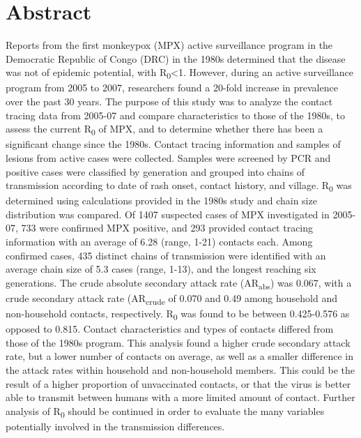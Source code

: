 \section{Abstract}

Reports from the first monkeypox (MPX) active surveillance program in the Democratic Republic of Congo (DRC) in the 1980s determined that the disease was not of epidemic potential, with R\textsubscript{0}\textless1. However, during an active surveillance program from 2005 to 2007, researchers found a 20-fold increase in prevalence over the past 30 years. The purpose of this study was to analyze the contact tracing data from 2005-07 and compare characteristics to those of the 1980s, to assess the current R\textsubscript{0} of MPX, and to determine whether there has been a significant change since the 1980s. Contact tracing information and samples of lesions from active cases were collected. Samples were screened by PCR and positive cases were classified by generation and grouped into chains of transmission according to date of rash onset, contact history, and village. R\textsubscript{0} was determined using calculations provided in the 1980s study and chain size distribution was compared. Of 1407 suspected cases of MPX investigated in 2005-07, 733 were confirmed MPX positive, and 293 provided contact tracing information with an average of 6.28 (range, 1-21) contacts each. Among confirmed cases, 435 distinct chains of transmission were identified with an average chain size of 5.3 cases (range, 1-13), and the longest reaching six generations. The crude absolute secondary attack rate (AR\textsubscript{abs}) was 0.067, with a crude secondary attack rate (AR\textsubscript{crude} of 0.070 and 0.49 among household and non-household contacts, respectively. R\textsubscript{0} was found to be between 0.425-0.576 as opposed to 0.815. Contact characteristics and types of contacts differed from those of the 1980s program. This analysis found a higher crude secondary attack rate, but a lower number of contacts on average, as well as a smaller difference in the attack rates within household and non-household members. This could be the result of a higher proportion of unvaccinated contacts, or that the virus is better able to transmit between humans with a more limited amount of contact. Further analysis of R\textsubscript{0} should be continued in order to evaluate the many variables potentially involved in the transmission differences. 
